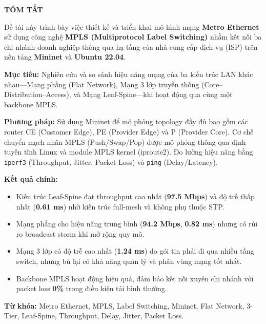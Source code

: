 \begin{center}
    {\large \textbf{TÓM TẮT}}
\end{center}
\vspace{0.3cm}

\noindent Đề tài này trình bày việc thiết kế và triển khai mô hình mạng \textbf{Metro Ethernet} sử dụng công nghệ \textbf{MPLS (Multiprotocol Label Switching)} nhằm kết nối ba chi nhánh doanh nghiệp thông qua hạ tầng của nhà cung cấp dịch vụ (ISP) trên nền tảng \textbf{Mininet} và \textbf{Ubuntu 22.04}.

\vspace{0.3cm}
\noindent \textbf{Mục tiêu:} Nghiên cứu và so sánh hiệu năng mạng của ba kiến trúc LAN khác nhau---Mạng phẳng (Flat Network), Mạng 3 lớp truyền thống (Core--Distribution--Access), và Mạng Leaf-Spine---khi hoạt động qua cùng một backbone MPLS.

\vspace{0.3cm}
\noindent \textbf{Phương pháp:} Sử dụng Mininet để mô phỏng topology đầy đủ bao gồm các router CE (Customer Edge), PE (Provider Edge) và P (Provider Core). Cơ chế chuyển mạch nhãn MPLS (Push/Swap/Pop) được mô phỏng thông qua định tuyến tĩnh Linux và module MPLS kernel (iproute2). Đo lường hiệu năng bằng \texttt{iperf3} (Throughput, Jitter, Packet Loss) và \texttt{ping} (Delay/Latency).

\vspace{0.3cm}
\noindent \textbf{Kết quả chính:}
\begin{itemize}
    \item Kiến trúc Leaf-Spine đạt throughput cao nhất (\textbf{97.5 Mbps}) và độ trễ thấp nhất (\textbf{0.61 ms}) nhờ kiến trúc full-mesh và không phụ thuộc STP.
    \item Mạng phẳng cho hiệu năng trung bình (\textbf{94.2 Mbps}, \textbf{0.82 ms}) nhưng có rủi ro broadcast storm khi mở rộng quy mô.
    \item Mạng 3 lớp có độ trễ cao nhất (\textbf{1.24 ms}) do gói tin phải đi qua nhiều tầng switch, nhưng bù lại có khả năng quản lý và phân vùng mạng tốt nhất.
    \item Backbone MPLS hoạt động hiệu quả, đảm bảo kết nối xuyên chi nhánh với packet loss \textbf{0\%} trong điều kiện tải bình thường.
\end{itemize}

\vspace{0.3cm}
\noindent \textbf{Từ khóa:} Metro Ethernet, MPLS, Label Switching, Mininet, Flat Network, 3-Tier, Leaf-Spine, Throughput, Delay, Jitter, Packet Loss.